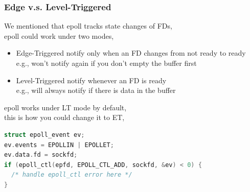 \documentclass[aspectratio=43]{beamer}
\begin{document}
\begin{frame}[fragile]
  \frametitle{Edge v.s. Level-Triggered}
    \hspace*{2em} \begin{minipage}{.8\textwidth}
   We mentioned that epoll tracks state changes of FDs,\\
   epoll could work under two modes,
   \begin{itemize}
   \item Edge-Triggered {\scriptsize notify only when an FD changes from not ready to ready}\\
   {\footnotesize e.g., won't notify again if you don't empty the buffer first }
   \item Level-Triggered {\scriptsize notify whenever an FD is ready}\\
   {\footnotesize e.g., will always notify if there is data in the buffer }
   \end{itemize}
   
   epoll works under LT mode by default,\\this is how you could change it to ET,
   \begin{lstlisting}[language=C++,basicstyle=\ttfamily\footnotesize,commentstyle=\color{commgreen},keywordstyle=\color{blue},breaklines=true]
struct epoll_event ev;
ev.events = EPOLLIN | EPOLLET;
ev.data.fd = sockfd;
if (epoll_ctl(epfd, EPOLL_CTL_ADD, sockfd, &ev) < 0) {
  /* handle epoll_ctl error here */
}
\end{lstlisting}
\end{minipage}
\end{frame}
\end{document}
